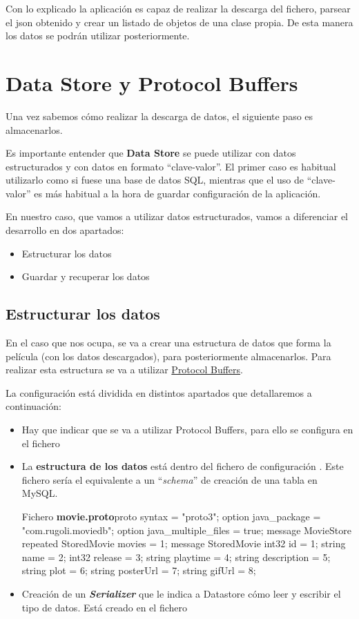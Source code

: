 \documentclass{\ClassPath/viu-tfm-template}
\begin{document}
Con lo explicado la aplicación es capaz de realizar la descarga del fichero, parsear el json obtenido y crear un listado de objetos de una clase propia. De esta manera los datos se podrán utilizar posteriormente.


\section{Data Store y Protocol Buffers}
Una vez sabemos cómo realizar la descarga de datos, el siguiente paso es almacenarlos.

Es importante entender que \textbf{Data Store} se puede utilizar con datos estructurados y con datos en formato “clave-valor”. El primer caso es habitual utilizarlo como si fuese una base de datos SQL, mientras que el uso de “clave-valor” es más habitual a la hora de guardar configuración de la aplicación.

En nuestro caso, que vamos a utilizar datos estructurados, vamos a diferenciar el desarrollo en dos apartados:
\begin{itemize}
    \item Estructurar los datos
    \item Guardar y recuperar los datos
\end{itemize}


\subsection{Estructurar los datos}
En el caso que nos ocupa, se va a crear una estructura de datos que forma la película (con los datos descargados), para posteriormente almacenarlos. Para realizar esta estructura se va a utilizar \href{https://developers.google.com/protocol-buffers}{Protocol Buffers}.

La configuración está dividida en distintos apartados que detallaremos a continuación:
\begin{itemize}
    \item Hay que indicar que se va a utilizar Protocol Buffers, para ello se configura en el fichero 

    \item La \textbf{estructura de los datos} está dentro del fichero de configuración . Este fichero sería el equivalente a un “\textit{schema}” de creación de una tabla en MySQL.
\begin{mycode}{Fichero \textbf{movie.proto}}{proto}{}
syntax = "proto3";
option java_package = "com.rugoli.moviedb";
option java_multiple_files = true;
message MovieStore {
    repeated StoredMovie movies = 1;
}
message StoredMovie{
    int32 id = 1;
    string name = 2;
    int32 release = 3;
    string playtime = 4;
    string description = 5;
    string plot = 6;
    string posterUrl = 7;
    string gifUrl = 8;
}
\end{mycode}

    \item Creación de un \textbf{\textit{Serializer}} que le indica a Datastore cómo leer y escribir el tipo de datos. Está creado en el fichero 
\end{itemize}
\end{document}

